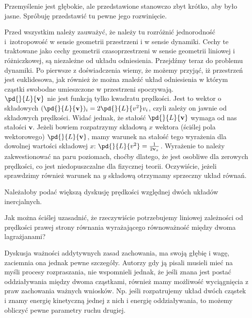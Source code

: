 \documentclass[a4paper,11pt]{article}
\begin{document}
\start {} Przemyślenie jest głębokie, ale przedstawione
stanowczo zbyt krótko, aby było jasne. Spróbuję przedstawić tu pewne
jego rozwinięcie.

Przed wszystkim należy zauważyć, że należy tu rozróżnić jednorodność
i~izotropowość w sensie geometrii przestrzeni i w sensie dynamiki.
Cechy te traktowane jako cechy geometrii czasoprzestrzeni w sensie
geometrii liniowej i różniczkowej, są niezależne od układu
odniesienia. Przejdźmy teraz do problemu dynamiki. Po pierwsze z
doświadczenia wiemy, że możemy przyjąć, iż przestrzeń jest
euklidesowa, jak również że można znaleźć układ odniesienia w którym
cząstki swobodne umieszczone w przestrzeni spoczywają. \\
\start {} $\pd{}{ L }{ \mathbf{ v } }$ nie jest funkcją tylko
kwadratu prędkości. Jest to wektor o składowych
$( \pd{}{ L }{ \mathbf{ v }} )_{ i } = 2 \pd{}{ L }{ { v^{ 2 } } } v_{
  i }$, czyli zależy on jawnie od składowych prędkości. Widać jednak,
że stałość $\pd{}{ L }{ \mathbf{ v } }$ wymaga od nas stałości
$\mathbf{ v }$. Jeżeli bowiem rozpatrzymy składową $x$ wektora
(ściślej pola wektorowego) $\pd{}{ L }{ \mathbf{ v } }$, mamy warunek
na stałość tego wyrażenia dla dowolnej wartości składowej $x$:
$\pd{}{ L }{ { v^{ 2 } } } = \frac{ 1 }{ 2 \mathbf{ v }_{ x } }$.
Wyrażenie to należy zakwestionować na paru poziomach, choćby dlatego,
że jest osobliwe dla zerowych prędkości, co jest niedopuszczalne dla
fizycznej teorii. Oczywiście, jeżeli sprawdzimy również warunek na
$ y $ składową otrzymamy sprzeczny układ równań.

\start {} Należałoby podać większą dyskusję prędkości względnej
dwóch układów inercjalnych.

\start {} Jak można ściślej uzasadnić, że rzeczywiście
potrzebujemy liniowej zależności od prędkości prawej strony równania
wyrażającego równoważność między dwoma lagrażjanami? \Dok

\start {} Dyskusja ważności addytywnych zasad zachowania, ma
swoją głębię i wagę, zaciemnia ona jednak pewne szczegóły. Autorzy gdy
ją pisali musieli mieć na myśli procesy rozpraszania, nie wspomnieli
jednak, że jeśli znana jest postać oddziaływania między dwoma
cząstkami, również mamy możliwość wyciągnięcia z praw zachowania
ważnych wniosków. Np. jeśli rozpatrujemy układ dwóch cząstek i znamy
energię kinetyczną jednej z nich i energię oddziaływania, to możemy
obliczyć pewne parametry ruchu drugiej.
\end{document}

